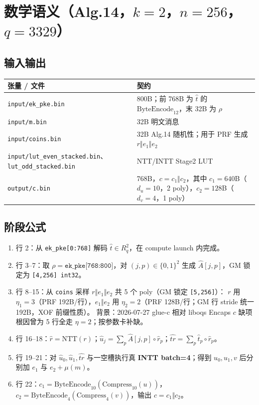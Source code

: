 \documentclass[UTF8,a4paper,11pt]{ctexart}
\begin{document}
\section{数学语义（Alg.14，$k=2$，$n=256$，$q=3329$）}

\subsection{输入输出}

\begin{longtable}{@{}L{3.3cm}L{10.2cm}@{}}
\toprule
张量 / 文件 & 契约 \\
\midrule
\texttt{input/ek\_pke.bin} & 800B；前 768B 为 \(\hat t\) 的 \(\mathrm{ByteEncode}_{12}\)，末 32B 为 \(\rho\) \\
\texttt{input/m.bin} & 32B 明文消息 \\
\texttt{input/coins.bin} & 32B Alg.14 随机性；用于 PRF 生成 \(r\Vert e_1\Vert e_2\) \\
\texttt{input/lut\_even\_stacked.bin}、\texttt{lut\_odd\_stacked.bin} & NTT/INTT Stage2 LUT \\
\texttt{output/c.bin} & 768B，\(c=c_1\Vert c_2\)，其中 \(c_1=640\)B（\(d_u=10\)，2 poly），\(c_2=128\)B（\(d_v=4\)，1 poly） \\
\bottomrule
\end{longtable}

\subsection{阶段公式}

\begin{enumerate}
  \item 行 2：从 \texttt{ek\_pke[0:768]} 解码 \(\hat t\in R_q^2\)，在 compute launch 内完成。
  \item 行 3--7：取 \(\rho=\texttt{ek\_pke[768:800]}\)，对 \((j,p)\in\{0,1\}^2\) 生成 \(\hat A[j,p]\)，GM 锁定为 \texttt{[4,256] int32}。
  \item 行 8--15：从 \texttt{coins} 采样 \(r\Vert e_1\Vert e_2\) 共 5 个 poly（GM 锁定 \texttt{[5,256]}）：
        \(r\) 用 \(\eta_1=3\)（PRF 192B/行），\(e_1\Vert e_2\) 用 \(\eta_2=2\)（PRF 128B/行；GM 行 stride 统一 192B，XOF 前缀性质）。
        背景：2026-07-27 glue-c 相对 liboqs Encaps \(c\) 缺项根因曾为 5 行全走 \(\eta=2\)；按参数卡补缺。
  \item 行 16--18：\(\hat r=\mathrm{NTT}(r)\)；\(\hat u_j=\sum_p \hat A[j,p]\circ\hat r_p\)；\(\widehat{tr}=\sum_p \hat t_p\circ\hat r_p\)。
  \item 行 19--21：对 \(\hat u_0,\hat u_1,\widehat{tr}\) 与一空槽执行真 \textbf{INTT batch=4}；得到 \(u_0,u_1,v\) 后分别加 \(e_1\) 与 \(e_2+\mu(m)\)。
  \item 行 22：\(c_1=\mathrm{ByteEncode}_{10}(\mathrm{Compress}_{10}(u))\)，\(c_2=\mathrm{ByteEncode}_{4}(\mathrm{Compress}_{4}(v))\)，输出 \(c=c_1\Vert c_2\)。
\end{enumerate}
\end{document}
